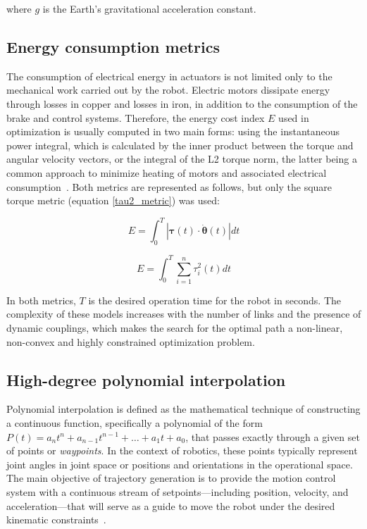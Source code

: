 \documentclass[runningheads]{llncs}
\begin{document}
where $g$ is the Earth's gravitational acceleration constant.

\subsection{Energy consumption metrics}
The consumption of electrical energy in actuators is not limited only to the mechanical work carried out by the robot. Electric motors dissipate energy through losses in copper and losses in iron, in addition to the consumption of the brake and control systems. Therefore, the energy cost index $E$ used in optimization is usually computed in two main forms: using the instantaneous power integral, which is calculated by the inner product between the torque and angular velocity vectors, or the integral of the L2 torque norm, the latter being a common approach to minimize heating of motors and associated electrical consumption~\cite{ref_dynamics2}. Both metrics are represented as follows, but only the square torque metric (equation \ref{tau2_metric}) was used:

\begin{equation}
    E=\int_0^T |\boldsymbol \tau (t) \cdot \boldsymbol{\dot \theta} (t)| dt
\end{equation}

\begin{equation}\label{tau2_metric}
    E=\int_0^T \sum_{i=1}^n \tau_i^2 (t) dt
\end{equation}

In both metrics, $T$ is the desired operation time for the robot in seconds.
The complexity of these models increases with the number of links and the presence of dynamic couplings, which makes the search for the optimal path a non-linear, non-convex and highly constrained optimization problem.

\subsection{High-degree polynomial interpolation}
Polynomial interpolation is defined as the mathematical technique of constructing a continuous function, specifically a polynomial of the form $P(t) = a_n t^n + a_{n-1} t^{n-1} + \dots + a_1 t + a_0$, that passes exactly through a given set of points or \textit{waypoints}. In the context of robotics, these points typically represent joint angles in joint space or positions and orientations in the operational space. The main objective of trajectory generation is to provide the motion control system with a continuous stream of setpoints—including position, velocity, and acceleration—that will serve as a guide to move the robot under the desired kinematic constraints~\cite{ref_polyint}.
\end{document}
